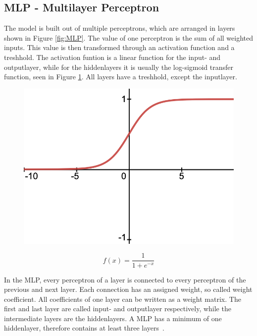 \documentclass[11pt]{scrartcl}
\begin{document}
	\subsection{MLP - Multilayer Perceptron}
	
	The model is built out of multiple perceptrons, which are arranged in layers shown in Figure \ref{fig:MLP}. The value of one perceptron is the sum of all weighted inputs. This value is then transformed through an activation function and a treshhold. The activation funtion is a linear function for the input- and outputlayer, while for the hiddenlayers it is usually the log-sigmoid transfer function, seen in Figure \ref{fig:log-sigmoid function}. All layers have a treshhold, except the inputlayer. 
	
	\begin{figure}[H]
	\centering
	\begin{minipage}{.5\textwidth}
	  \centering
	  \includegraphics[width=0.75\linewidth]{figures/log-sigmoid.png}
	\end{minipage}%
	\begin{minipage}{.5\textwidth}
	  \centering
		\begin{equation*}
			f(x) = \frac{1}{1 +e^{-x}}
		\end{equation*}
	\end{minipage}
	\label{fig:log-sigmoid function}
	\end{figure}
	
	In the MLP, every perceptron of a layer is connected to every perceptron of the previous and next layer. Each connection has an assigned weight, so called weight coefficient. All coefficients of one layer can be written as a weight matrix. The first and last layer are called input- and outputlayer respectively, while the intermediate layers are the hiddenlayers. A MLP has a minimum of one hiddenlayer, therefore contains at least three layers~\cite{MLP08}.
	
\end{document}
